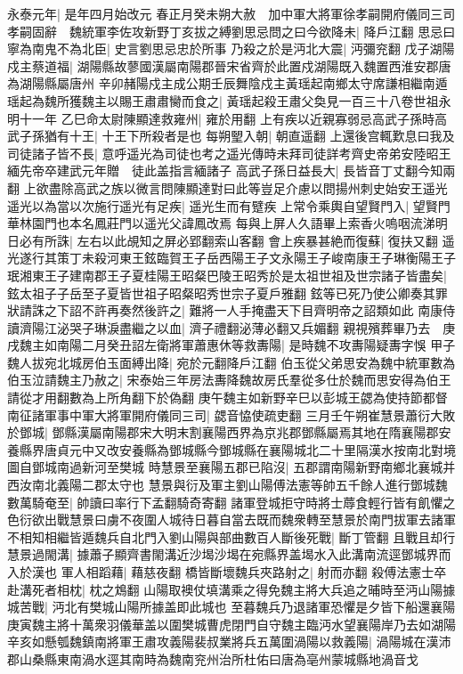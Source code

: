 永泰元年|{
	是年四月始改元}
春正月癸未朔大赦　加中軍大將軍徐孝嗣開府儀同三司孝嗣固辭　魏統軍李佐攻新野丁亥拔之縛劉思忌問之曰今欲降未|{
	降戶江翻}
思忌曰寧為南鬼不為北臣|{
	史言劉思忌忠於所事}
乃殺之於是沔北大震|{
	沔彌兖翻}
戊子湖陽戍主蔡道福|{
	湖陽縣故蓼國漢屬南陽郡晉宋省齊於此置戍湖陽既入魏置西淮安郡唐為湖陽縣屬唐州}
辛卯赭陽戍主成公期壬辰舞陰戍主黃瑶起南鄉太守席謙相繼南遁瑶起為魏所獲魏主以賜王肅肅臠而食之|{
	黃瑶起殺王肅父奐見一百三十八卷世祖永明十一年}
乙巳命太尉陳顯達救雍州|{
	雍於用翻}
上有疾以近親寡弱忌高武子孫時高武子孫猶有十王|{
	十王下所殺者是也}
每朔朢入朝|{
	朝直遥翻}
上還後宫輒歎息曰我及司徒諸子皆不長|{
	意呼遥光為司徒也考之遥光傳時未拜司徒詳考齊史帝弟安陸昭王緬先帝卒建武元年贈　徒此盖指言緬諸子}
高武子孫日益長大|{
	長皆音丁丈翻今知兩翻}
上欲盡除高武之族以微言問陳顯達對曰此等豈足介慮以問揚州刺史始安王遥光遥光以為當以次施行遥光有足疾|{
	遥光生而有躄疾}
上常令乘輿自望賢門入|{
	望賢門華林園門也本名鳳莊門以遥光父諱鳳改焉}
每與上屏人久語畢上索香火嗚咽流涕明日必有所誅|{
	左右以此覘知之屏必郢翻索山客翻}
會上疾暴甚絶而復蘇|{
	復扶又翻}
遥光遂行其策丁未殺河東王鉉臨賀王子岳西陽王子文永陽王子峻南康王子琳衡陽王子珉湘東王子建南郡王子夏桂陽王昭粲巴陵王昭秀於是太祖世祖及世宗諸子皆盡矣|{
	鉉太祖子子岳至子夏皆世祖子昭粲昭秀世宗子夏戶雅翻}
鉉等已死乃使公卿奏其罪狀請誅之下詔不許再奏然後許之|{
	難將一人手掩盡天下目齊明帝之詔類如此}
南康侍讀濟陽江泌哭子琳淚盡繼之以血|{
	濟子禮翻泌薄必翻又兵媚翻}
親視殯葬畢乃去　庚戌魏主如南陽二月癸丑詔左衛將軍蕭惠休等救夀陽|{
	是時魏不攻夀陽疑夀字悞}
甲子魏人拔宛北城房伯玉面縛出降|{
	宛於元翻降戶江翻}
伯玉從父弟思安為魏中統軍數為伯玉泣請魏主乃赦之|{
	宋泰始三年房法夀降魏故房氏羣從多仕於魏而思安得為伯王請從才用翻數為上所角翻下於偽翻}
庚午魏主如新野辛巳以彭城王勰為使持節都督南征諸軍事中軍大將軍開府儀同三司|{
	勰音恊使疏吏翻}
三月壬午朔崔慧景蕭衍大敗於鄧城|{
	鄧縣漢屬南陽郡宋大明末割襄陽西界為京兆郡鄧縣屬焉其地在隋襄陽郡安養縣界唐貞元中又改安養縣為鄧城縣今鄧城縣在襄陽城北二十里隔漢水按南北對境圖自鄧城南過新河至樊城}
時慧景至襄陽五郡已陷沒|{
	五郡謂南陽新野南鄉北襄城并西汝南北義陽二郡太守也}
慧景與衍及軍主劉山陽傅法憲等帥五千餘人進行鄧城魏數萬騎奄至|{
	帥讀曰率行下孟翻騎奇寄翻}
諸軍登城拒守時將士蓐食輕行皆有飢懼之色衍欲出戰慧景曰虜不夜圍人城待日暮自當去既而魏衆轉至慧景於南門拔軍去諸軍不相知相繼皆遁魏兵自北門入劉山陽與部曲數百人斷後死戰|{
	斷丁管翻}
且戰且却行慧景過閙溝|{
	據蕭子顯齊書閙溝近沙堨沙堨在宛縣界盖堨水入此溝南流逕鄧城界而入於漢也}
軍人相蹈藉|{
	藉慈夜翻}
橋皆斷壞魏兵夾路射之|{
	射而亦翻}
殺傅法憲士卒赴溝死者相枕|{
	枕之鴆翻}
山陽取襖仗填溝乘之得免魏主將大兵追之晡時至沔山陽據城苦戰|{
	沔北有樊城山陽所據盖即此城也}
至暮魏兵乃退諸軍恐懼是夕皆下船還襄陽庚寅魏主將十萬衆羽儀華盖以圍樊城曹虎閉門自守魏主臨沔水望襄陽岸乃去如湖陽辛亥如懸瓠魏鎮南將軍王肅攻義陽裴叔業將兵五萬圍渦陽以救義陽|{
	渦陽城在漢沛郡山桑縣東南渦水逕其南時為魏南兖州治所杜佑曰唐為亳州蒙城縣地渦音戈}
